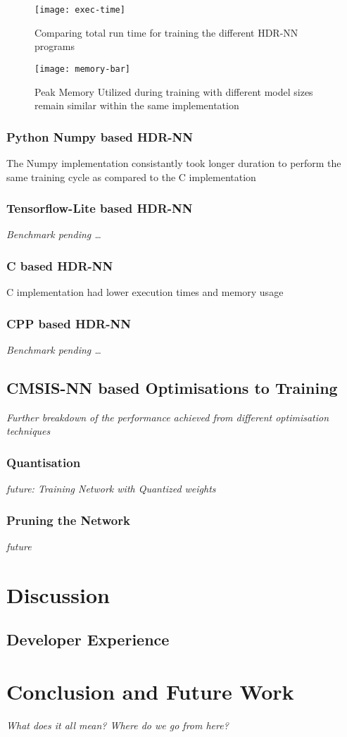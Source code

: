 \begin{figure}[ht]
	\centering
	\texttt{[image: exec-time]}
	\caption[Execution Time vs Model Parameters]{Comparing total run time for training the different HDR-NN programs}
\end{figure}

\begin{figure}[ht]
	\centering
	\texttt{[image: memory-bar]}
	\caption[Peak Memory Utilisation]{Peak Memory Utilized during training with different model sizes remain similar within the same implementation}
\end{figure}

\subsection[Python - Numpy]{Python Numpy based HDR-NN}

The Numpy implementation consistantly took longer duration to perform the same training cycle as compared to the C implementation

\subsection[Tensorflow Lite]{Tensorflow-Lite based HDR-NN}
\textit{Benchmark pending \dots}

\subsection[C]{C based HDR-NN}

C implementation had lower execution times and memory usage

\subsection[CPP - Eigen]{CPP based HDR-NN}
\textit{Benchmark pending \dots}

\section{CMSIS-NN based Optimisations to Training}
\textit{Further breakdown of the performance achieved from different optimisation techniques}

\subsection{Quantisation}
\textit{future: Training Network with Quantized weights}

\subsection{Pruning the Network}
\textit{future}

\chapter{Discussion}

\section{Developer Experience}

\chapter{Conclusion and Future Work}
\textit{What does it all mean? Where do we go from here?}
